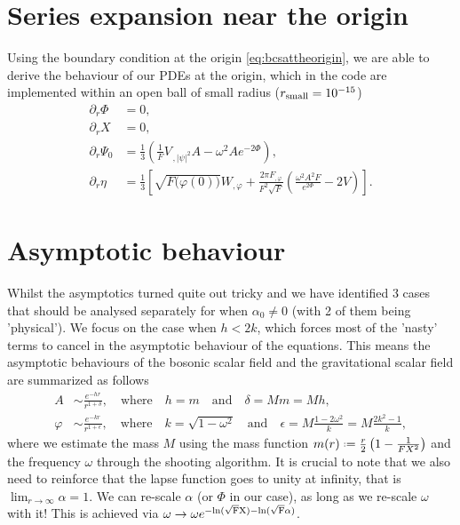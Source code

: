 \documentclass[12pt]{article}
\numberwithin{equation}{section}
\newcommand*{\defeq}{\mathrel{\vcenter{\baselineskip0.5ex \lineskiplimit0pt
                     \hbox{\scriptsize.}\hbox{\scriptsize.}}}%
                     =}
\begin{document}
\section{Series expansion near the origin}
Using the boundary condition at the origin \eqref{eq:bcsattheorigin}, we are able to derive the behaviour of our PDEs at the origin, which in the code are implemented within an open ball of small radius ($r_{\rm{small}} = 10^{-15}$)
\begin{align}
    \partial_r \Phi &= 0, \\
    \partial_r X & = 0, \\
    \partial_r \Psi_0 &= \frac{1}{3} \left(\frac{1}{F} V_{\,,|\psi|^2} A - \omega^2 A e^{-2 \Phi} \right), \\
    \partial_r \eta & = \frac{1}{3} \left[\sqrt{F({\varphi(0))}} W_{, \varphi} + \frac{2 \pi F_{, \varphi}}{F^2 \sqrt{F}}
     \left(\frac{\omega^2 A^2 F}{e^{2 \Phi}} - 2V \right) \right].
\end{align}

\section{Asymptotic behaviour}
Whilst the asymptotics turned quite out tricky and we have identified 3 cases that should be analysed separately for when $\alpha_0 \neq 0$ (with 2 of them being 'physical'). We focus on the case when $h < 2k$, which forces most of the 'nasty' terms to cancel in the asymptotic behaviour of the equations. This means the asymptotic behaviours of the bosonic scalar field and the gravitational scalar field are summarized as follows
\begin{align}
    A & \sim \frac{e^{-hr}}{r^{1+\delta}}, \quad \text{where} \quad h=m \quad \text{and} \quad \delta = Mm = Mh, \\
    \varphi & \sim \frac{e^{-kr}}{r^{1+\epsilon}}, \quad \text{where} \quad k=\sqrt{1-\omega^2} \quad \text{and} \quad \epsilon = M\frac{1-2\omega^2}{k} = M\frac{2k^2-1}{k},
\end{align}
where we estimate the mass $M$ using the mass function $m(r) \defeq \frac{r}{2} \left(1-\frac{1}{FX^2}\right)$ and the frequency $\omega$ through the shooting algorithm. It is crucial to note that we also need to reinforce that the lapse function goes to unity at infinity, that is $\lim_{r \to \infty} \alpha = 1$. We can re-scale $\alpha$ (or $\Phi$ in our case), as long as we re-scale $\omega$ with it! This is achieved via $\omega \rightarrow \omega e^{-\rm{ln}(\sqrt{F}X) -\rm{ln}(\sqrt{F}\alpha)}$.
\end{document}
